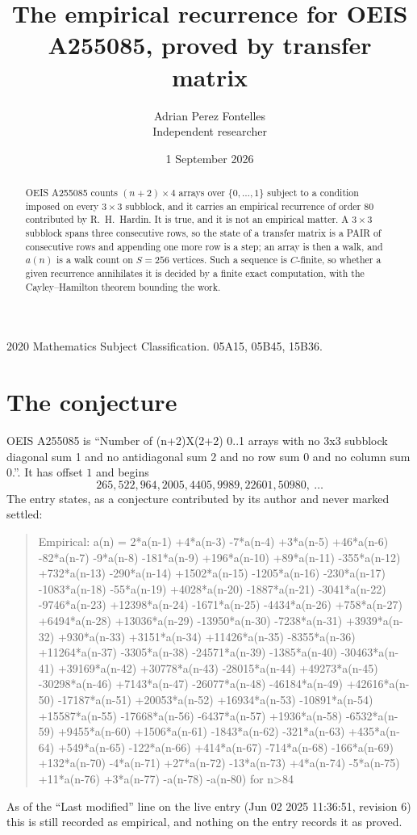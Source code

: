 \documentclass[11pt,a4paper]{article}
\title{The empirical recurrence for OEIS A255085, proved by transfer matrix}
\author{Adrian Perez Fontelles\\ \small Independent researcher}
\date{1 September 2026}
\theoremstyle{plain}
\theoremstyle{definition}
\begin{document}
\maketitle

\begin{abstract}
OEIS A255085 counts $(n+2)\times4$ arrays over $\{0,\dots,1\}$ subject to a condition imposed on
every $3\times3$ subblock, and it carries an empirical recurrence of order $80$
contributed by R.~H.~Hardin. It is true, and it is not an empirical matter. A $3\times3$
subblock spans three consecutive rows, so the state of a transfer matrix is a PAIR of
consecutive rows and appending one more row is a step; an array is then a walk, and
$a(n)$ is a walk count on $S=256$ vertices. Such a sequence is $C$-finite, so whether a given
recurrence annihilates it is decided by a finite exact computation, with the Cayley--Hamilton
theorem bounding the work.
\end{abstract}

\noindent\small 2020 Mathematics Subject Classification. 05A15, 05B45, 15B36.\normalsize

\section{The conjecture}

OEIS A255085 is ``Number of (n+2)X(2+2) 0..1 arrays with no 3x3 subblock diagonal sum 1 and no antidiagonal sum 2 and no row sum 0 and no column sum 0.''. It has offset $1$ and begins
\[
265, 522, 964, 2005, 4405, 9989, 22601, 50980,\ \dots
\]
The entry states, as a conjecture contributed by its author and never marked settled:
\begin{quote}
Empirical: a(n) = 2*a(n-1) +4*a(n-3) -7*a(n-4) +3*a(n-5) +46*a(n-6) -82*a(n-7) -9*a(n-8) -181*a(n-9) +196*a(n-10) +89*a(n-11) -355*a(n-12) +732*a(n-13) -290*a(n-14) +1502*a(n-15) -1205*a(n-16) -230*a(n-17) -1083*a(n-18) -55*a(n-19) +4028*a(n-20) -1887*a(n-21) -3041*a(n-22) -9746*a(n-23) +12398*a(n-24) -1671*a(n-25) -4434*a(n-26) +758*a(n-27) +6494*a(n-28) +13036*a(n-29) -13950*a(n-30) -7238*a(n-31) +3939*a(n-32) +930*a(n-33) +3151*a(n-34) +11426*a(n-35) -8355*a(n-36) +11264*a(n-37) -3305*a(n-38) -24571*a(n-39) -1385*a(n-40) -30463*a(n-41) +39169*a(n-42) +30778*a(n-43) -28015*a(n-44) +49273*a(n-45) -30298*a(n-46) +7143*a(n-47) -26077*a(n-48) -46184*a(n-49) +42616*a(n-50) -17187*a(n-51) +20053*a(n-52) +16934*a(n-53) -10891*a(n-54) +15587*a(n-55) -17668*a(n-56) -6437*a(n-57) +1936*a(n-58) -6532*a(n-59) +9455*a(n-60) +1506*a(n-61) -1843*a(n-62) -321*a(n-63) +435*a(n-64) +549*a(n-65) -122*a(n-66) +414*a(n-67) -714*a(n-68) -166*a(n-69) +132*a(n-70) -4*a(n-71) +27*a(n-72) -13*a(n-73) +4*a(n-74) -5*a(n-75) +11*a(n-76) +3*a(n-77) -a(n-78) -a(n-80) for n>84
\end{quote}
As of the ``Last modified'' line on the live entry (Jun 02 2025 11:36:51, revision 6) this is still
recorded as empirical, and nothing on the entry records it as proved.
\end{document}
